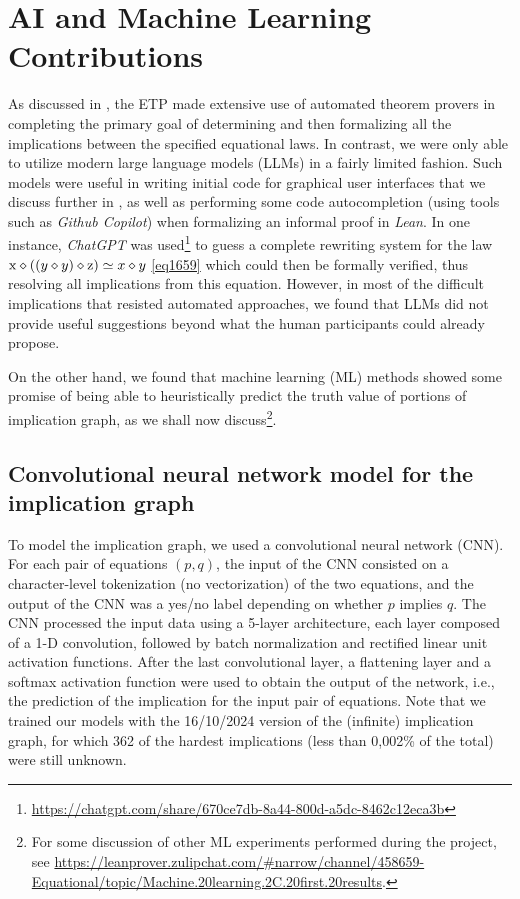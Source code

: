 \section{AI and Machine Learning Contributions}\label{ml-sec}

As discussed in , the ETP made extensive use of automated theorem provers in completing the primary goal of determining and then formalizing all the implications between the specified equational laws.  In contrast, we were only able to utilize modern large language models (LLMs) in a fairly limited fashion.  Such models were useful in writing initial code for graphical user interfaces that we discuss further in , as well as performing some code autocompletion (using tools such as \emph{Github Copilot}) when formalizing an informal proof in \emph{Lean}.  In one instance, \emph{ChatGPT} was used\footnote{\url{https://chatgpt.com/share/670ce7db-8a44-800d-a5dc-8462c12eca3b}} to guess a complete rewriting system for the law $\mathrm{x} \diamond ((y \diamond y) \diamond \mathrm{z}) \simeq x \diamond y$ \eqref{eq1659} which could then be formally verified, thus resolving all implications from this equation. However, in most of the difficult implications that resisted automated approaches, we found that LLMs did not provide useful suggestions beyond what the human participants could already propose.

On the other hand, we found that machine learning (ML) methods showed some promise of being able to heuristically predict the truth value of portions of implication graph, as we shall now discuss\footnote{For some discussion of other ML experiments performed during the project, see \url{https://leanprover.zulipchat.com/\#narrow/channel/458659-Equational/topic/Machine.20learning.2C.20first.20results}.}.

\subsection{Convolutional neural network model for the implication graph}

To model the implication graph, we used a convolutional neural network (CNN). For each pair of equations $(p,q)$, the input of the CNN consisted on a character-level tokenization (no vectorization) of the two equations, and the output of the CNN was a yes/no label depending on whether $p$ implies $q$. The CNN processed the input data using a 5-layer architecture, each layer composed of a 1-D convolution, followed by batch normalization and rectified linear unit activation functions\cite{Goodfellow-et-al-2016}. After the last convolutional layer, a flattening layer and a softmax activation function were used to obtain the output of the network, i.e., the prediction of the implication for the input pair of equations. Note that we trained our models with the 16/10/2024 version of the (infinite) implication graph, for which 362 of the hardest implications (less than 0,002\% of the total) were still unknown.

